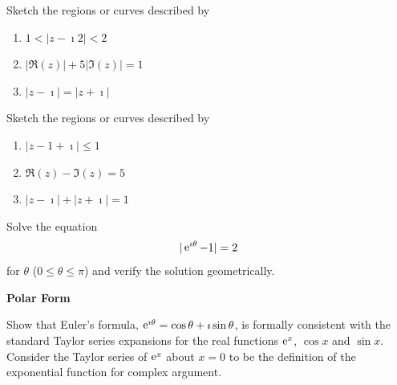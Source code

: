 {%
\begin{Exercise}
  \label{exercise 1 z-i2 2}
  Sketch the regions or curves described by
  \begin{enumerate}
  \item
    $\displaystyle
    1 < |z - \imath 2| < 2
    $
  \item
    $\displaystyle
    | \Re(z) | + 5 | \Im(z) | = 1
    $
  \item
    $\displaystyle
    |z - \imath|=|z + \imath|
    $
  \end{enumerate}

\end{Exercise}




\begin{Exercise}
  \label{exercise z-1+i 1}
  Sketch the regions or curves described by
  \begin{enumerate}
  \item
    $\displaystyle
    |z - 1 + \imath|\leq 1
    $
  \item
    $\displaystyle
    \Re(z)- \Im(z) = 5
    $
  \item
    $\displaystyle
    |z - \imath| + |z + \imath| = 1
    $
  \end{enumerate}

\end{Exercise}





\begin{Exercise}
  \label{exercise e i theta - 1 = 2}
  Solve the equation
  \[
  |\mathop{\mathrm{e}}\nolimits^{\imath \theta}-1| = 2
  \]
  for $\theta$ ($0 \leq \theta \leq \pi$) and verify the solution geometrically.

\end{Exercise}






\begin{large}
  \noindent
  \textbf{Polar Form}
\end{large}



\begin{Exercise}
  \label{exercise eulers formula}
  Show that Euler's formula, $\mathop{\mathrm{e}}\nolimits^{\imath \theta} = \cos \theta + \imath \sin \theta$, is
  formally consistent with the standard Taylor series expansions for
  the real functions $\mathop{\mathrm{e}}\nolimits^x$, $\cos x$ and $\sin x$.  Consider the
  Taylor series of $\mathop{\mathrm{e}}\nolimits^x$ about $x = 0$ to be the definition of the
  exponential function for complex argument.


\end{Exercise}}
